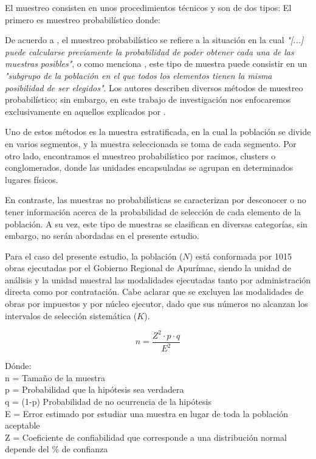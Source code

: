 El muestreo consisten en unos procedimientos técnicos y son de dos tipos: El primero es muestreo probabilístico donde:

De acuerdo a \cite[]{SanchezCarlessi2015}, el muestreo probabilístico se refiere a la situación en la cual \emph{"[...] puede calcularse previamente la probabilidad de poder obtener cada una de las muestras posibles"}, o como menciona \citeauthor{HernandezSampieri2014}, este tipo de muestra puede consistir en un \emph{"subgrupo de la población en el que todos los elementos tienen la misma posibilidad de ser elegidos"}. Los autores describen diversos métodos de muestreo probabilístico; sin embargo, en este trabajo de investigación nos enfocaremos exclusivamente en aquellos explicados por \citeauthor{HernandezSampieri2014}.

Uno de estos métodos es la muestra estratificada, en la cual la población se divide en varios segmentos, y la muestra seleccionada se toma de cada segmento. Por otro lado, encontramos el muestreo probabilístico por racimos, clusters o conglomerados, donde las unidades encapsuladas se agrupan en determinados lugares físicos.

En contraste, las muestras no probabilísticas se caracterizan por desconocer o no tener información acerca de la probabilidad de selección de cada elemento de la población. A su vez, este tipo de muestras se clasifican en diversas categorías, sin embargo, no serán abordadas en el presente estudio.

Para el caso del presente estudio, la población (\(N\)) está conformada por 1015 obras ejecutadas por el Gobierno Regional de Apurímac, siendo la unidad de análisis y la unidad muestral las modalidades ejecutadas tanto por administración directa como por contratación. Cabe aclarar que se excluyen las modalidades de obras por impuestos y por núcleo ejecutor, dado que sus números no alcanzan los intervalos de selección sistemática (\(K\)).

\[
n = \dfrac{Z^{2} \cdot p \cdot q }{E^{2}}
\]

Dónde:\\
\noindent n = Tamaño de la muestra\\
p = Probabilidad que la hipótesis sea verdadera\\
q = (1-p) Probabilidad de no ocurrencia de la hipótesis\\
E = Error estimado por estudiar una muestra en lugar de toda la población aceptable\\
Z = Coeficiente de confiabilidad que corresponde a una distribución normal depende del \% de confianza


